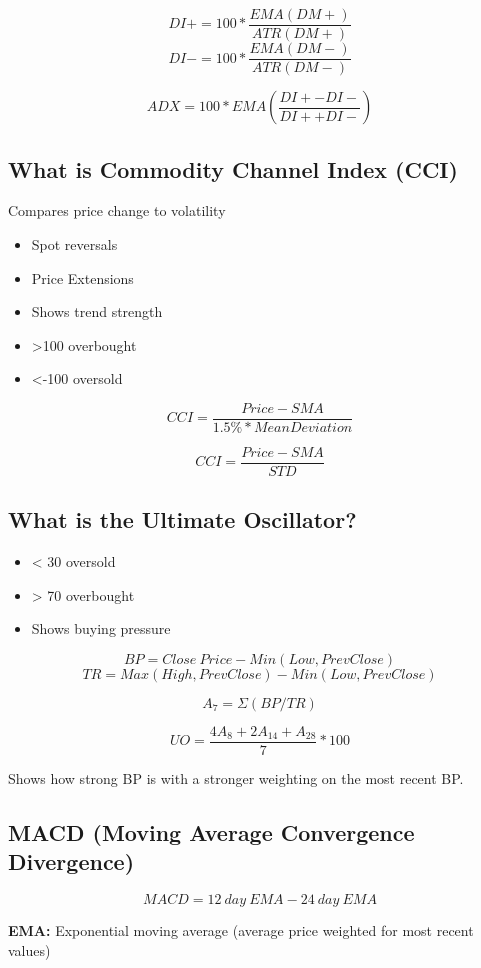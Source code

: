 \documentclass[11pt]{scrartcl} %
\begin{document}
\[ DI+ = 100 * \frac{EMA(DM+)}{ATR(DM+)} \]
\[ DI- = 100 * \frac{EMA(DM-)}{ATR(DM-)} \]

\[ ADX = 100 * EMA(\frac{DI+ - DI-}{DI+ + DI-}) \]

\subsection{What is Commodity Channel Index (CCI)}

Compares price change to volatility

\begin{itemize}
	\item Spot reversals
	\item Price Extensions
	\item Shows trend strength
	\item >100 overbought
	\item <-100 oversold
\end{itemize}

\[ CCI = \frac{Price - SMA}{1.5\% * Mean Deviation} \]

\[ CCI = \frac{Price - SMA}{STD} \]

\subsection{What is the Ultimate Oscillator?}

\begin{itemize}
	\item < 30 oversold
	\item > 70 overbought
	\item Shows buying pressure
\end{itemize}

\[ BP = Close\:Price - Min(Low,Prev Close) \]
\[ TR = Max(High,Prev Close) - Min(Low, Prev Close) \]

\[ A_7 = \Sigma(BP/TR) \]

\[ UO = \frac{4A_8 + 2A_{14} + A_{28}}{7} *100 \]

Shows how strong BP is with a stronger weighting on the most recent BP.

\subsection{MACD (Moving Average Convergence Divergence)}

\[ MACD = 12\:day\:EMA - 24\:day\:EMA \] 

\textbf{EMA:} Exponential moving average (average price weighted for most recent values)
\end{document}
